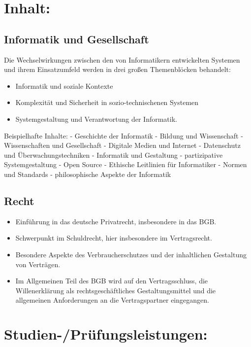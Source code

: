 \section{Inhalt:}\label{inhalt-16}

\subsection{Informatik und
Gesellschaft}\label{informatik-und-gesellschaft}

Die Wechselwirkungen zwischen den von Informatikern entwickelten
Systemen und ihrem Einsatzumfeld werden in drei großen Themenblöcken
behandelt:

\begin{itemize}
\tightlist
\item
  Informatik und soziale Kontexte
\item
  Komplexität und Sicherheit in sozio-technischenen Systemen
\item
  Systemgestaltung und Verantwortung der Informatik.
\end{itemize}

Beispielhafte Inhalte: - Geschichte der Informatik - Bildung und
Wissenschaft - Wissenschaften und Gesellschaft - Digitale Medien und
Internet - Datenschutz und Überwachungstechniken - Informatik und
Gestaltung - partizipative Systemgestaltung - Open Source - Ethische
Leitlinien für Informatiker - Normen und Standards - philosophische
Aspekte der Informatik

\subsection{Recht}\label{recht}

\begin{itemize}
\tightlist
\item
  Einführung in das deutsche Privatrecht, insbesondere in das BGB.
\item
  Schwerpunkt im Schuldrecht, hier insbesondere im Vertragsrecht.
\item
  Besondere Aspekte des Verbraucherschutzes und der inhaltlichen
  Gestaltung von Verträgen.
\item
  Im Allgemeinen Teil des BGB wird auf den Vertragsschluss, die
  Willenerklärung als rechtsgeschäftliches Gestaltungsmittel und die
  allgemeinen Anforderungen an die Vertragspartner eingegangen.
\end{itemize}

\section{Studien-/Prüfungsleistungen:}\label{studien-pruxfcfungsleistungen-16}

